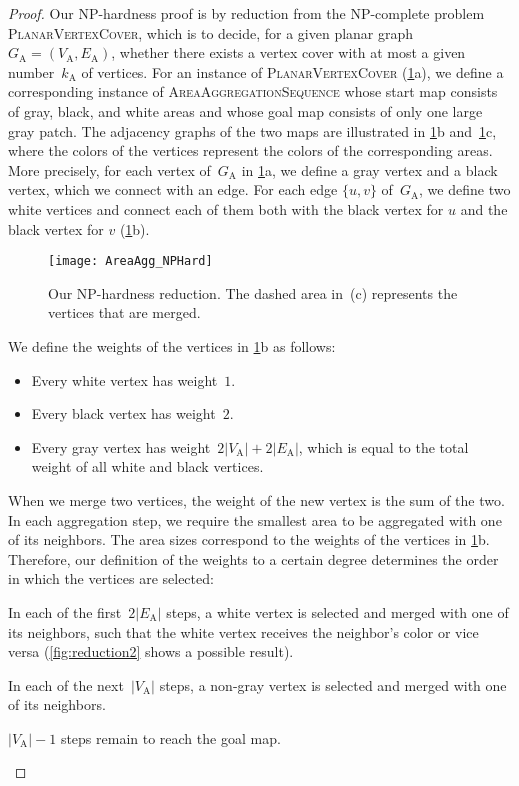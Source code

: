 \documentclass[acmsmall,natbib=false]{acmart}
\begin{document}
\begin{proof}
Our NP-hardness proof is by reduction from 
the NP-complete problem \textsc{PlanarVertexCover}, 
which is to decide, for a given 
planar graph~$G_\mathrm{A} = (V_\mathrm{A},E_\mathrm{A})$, 
whether there exists a vertex cover 
with at most a given number~$k_\mathrm{A}$ of vertices. 
For an instance of \textsc{PlanarVertexCover}
(\fig\ref{fig:AreaAgg_Reduction}a), 
we define a corresponding instance of \textsc{AreaAggregationSequence}
whose start map consists of gray, black, and white areas and 
whose goal map consists of only one large gray patch.
The adjacency graphs of the two maps are illustrated 
in \figs\ref{fig:AreaAgg_Reduction}b and~\ref{fig:AreaAgg_Reduction}c, 
where the colors of the vertices represent 
the colors of the corresponding areas.
More precisely, for each vertex of~$G_\mathrm{A}$
in \fig\ref{fig:AreaAgg_Reduction}a, 
we define a gray vertex and a black vertex, 
which we connect with an edge. 
For each edge $\{u,v\}$ of~$G_\mathrm{A}$, 
we define two white vertices and 
connect each of them both with the black vertex for $u$
and the black vertex for $v$
(\fig\ref{fig:AreaAgg_Reduction}b).

\begin{figure}[tb]
\centering
\texttt{[image: AreaAgg\_NPHard]}
\caption{Our NP-hardness reduction.  The dashed area in~(c) represents
  the vertices that are merged.}
\label{fig:AreaAgg_Reduction}
\end{figure}

We define the weights of the vertices 
in \fig\ref{fig:AreaAgg_Reduction}b as follows:
\begin{itemize}
\item Every white vertex has weight~$1$.
\item Every black vertex has weight~$2$.
\item Every gray vertex has weight~$2|V_\mathrm{A}| + 2|E_\mathrm{A}|$,
which is equal to the total weight of all white and black vertices.
\end{itemize}
When we merge two vertices, 
the weight of the new vertex is the sum of the two.
In each aggregation step, 
we require the smallest area to be aggregated with one of its neighbors.
The area sizes correspond to the weights of the vertices in \fig\ref{fig:AreaAgg_Reduction}b.   
Therefore, our definition of the weights to a certain degree determines 
the order in which the vertices are selected:
\begin{description}[leftmargin=1.7cm,style=sameline]
\item[\emph{Phase I}:] In each of the first~$2|E_\mathrm{A}|$ steps, 
a white vertex is selected and merged with one of its neighbors, 
such that the white vertex receives the neighbor's color or vice versa
(\fig\ref{fig:reduction2} shows a possible result).
\item[\emph{Phase II}:] In each of the next~$|V_\mathrm{A}|$ steps, 
a non-gray vertex is selected and merged with one of its neighbors.
\item[\emph{Phase III}:] $|V_\mathrm{A}|-1$ steps remain to reach the goal map.
\end{description}


\end{proof}
\end{document}
